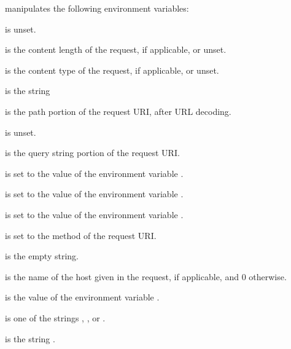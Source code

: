  manipulates the following environment variables:

 is unset.

 is the content length of the request, if
applicable, or unset.

 is the content type of the request, if
applicable, or unset.

 is the string 

 is the path portion of the request URI, after URL
decoding.

 is unset.

 is the query string portion of the request URI.

 is set to the value of the environment variable .

 is set to the value of the environment variable .

 is set to the value of the environment variable .

 is set to the method of the request URI.

 is the empty string.

 is the name of the host given in the request, if
applicable, and 0 otherwise.

 is the value of the environment variable .

 is one of the strings ,
, or .

 is the string .


